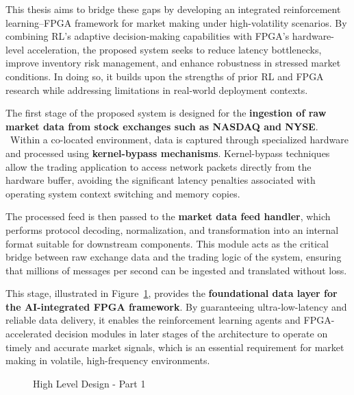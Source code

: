 This thesis aims to bridge these gaps by developing an integrated reinforcement learning–FPGA framework for market making under high-volatility scenarios. By combining RL’s adaptive decision-making capabilities with FPGA’s hardware-level acceleration, the proposed system seeks to reduce latency bottlenecks, improve inventory risk management, and enhance robustness in stressed market conditions. In doing so, it builds upon the strengths of prior RL and FPGA research while addressing limitations in real-world deployment contexts. 

\noindent
The first stage of the proposed system is designed for the \textbf{ingestion of raw market data from stock exchanges such as NASDAQ and NYSE}. \datamethodology\ Within a co-located environment, data is captured through specialized hardware and processed using \textbf{kernel-bypass mechanisms}. Kernel-bypass techniques allow the trading application to access network packets directly from the hardware buffer, avoiding the significant latency penalties associated with operating system context switching and memory copies.

The processed feed is then passed to the \textbf{market data feed handler}, which performs protocol decoding, normalization, and transformation into an internal format suitable for downstream components. This module acts as the critical bridge between raw exchange data and the trading logic of the system, ensuring that millions of messages per second can be ingested and translated without loss.

This stage, illustrated in Figure~\ref{fig:hld_1}, provides the \textbf{foundational data layer for the AI-integrated FPGA framework}. By guaranteeing ultra-low-latency and reliable data delivery, it enables the reinforcement learning agents and FPGA-accelerated decision modules in later stages of the architecture to operate on timely and accurate market signals, which is an essential requirement for market making in volatile, high-frequency environments. 

\begin{figure}
    \centering
    
    \caption{High Level Design - Part 1}
    \label{fig:hld_1}
\end{figure}

